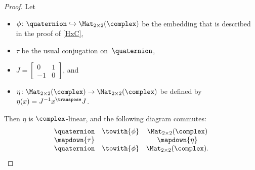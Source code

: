 \begin{proof}
 Let 
 \begin{itemize}
 \item $\phi \colon \quaternion \hookrightarrow \Mat_{2
\times 2}(\complex)$ be the embedding that is described in the proof
of \cref{HxC},
 \item $\tau$ be the usual conjugation on~$\quaternion$, 
 \item $J = 
 \begin{bmatrix}
 0 & 1 \\
 -1 & 0 
 \end{bmatrix}
 $, and
 \item $\eta \colon \Mat_{2 \times 2}(\complex)  \to \Mat_{2
\times 2}(\complex)$ be defined by 
 $\eta(x) = J^{-1} x^{\transpose} J$.
 \end{itemize}
 Then $\eta$ is $\complex$-linear, and the following diagram
commutes:
 $$ 
 \begin{matrix}
 \quaternion & \towith{\phi} & \Mat_{2 \times 2}(\complex) \\
 \mapdown{\tau} & & \mapdown{\eta} \\
 \quaternion & \towith{\phi} & \Mat_{2 \times 2}(\complex)
 . \end{matrix}
 $$


\end{proof}
